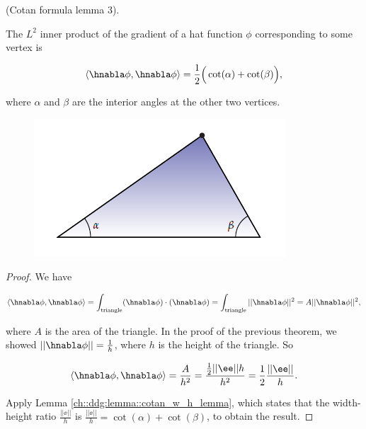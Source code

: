 \begin{lemma}
\label{ch::ddg::lemma::cotan_3}
    (Cotan formula lemma 3).
    
    The $L^2$ inner product of the gradient of a hat function $\phi$ corresponding to some vertex is
    
    \begin{align*}
        \langle \hnabla \phi, \hnabla \phi \rangle = \frac{1}{2} \Big(\cot(\alpha) + \cot(\beta) \Big),
    \end{align*}
    
    where $\alpha$ and $\beta$ are the interior angles at the other two vertices.
    
    \begin{figure}[H]
        \centering
        \includegraphics{images/fem_cotan_lemma3.PNG}
        \caption{\cite[p. 106]{book::DDG}}
    \end{figure}
\end{lemma}

\begin{proof}
    
    We have
    
    \begin{align*}
        \langle \hnabla \phi, \hnabla \phi \rangle
        = \int_{\text{triangle}} (\hnabla \phi) \cdot (\hnabla \phi)
        = \int_{\text{triangle}} ||\hnabla \phi||^2
        = A ||\hnabla \phi||^2,
    \end{align*}
    
    where $A$ is the area of the triangle. In the proof of the previous theorem, we showed $||\hnabla \phi|| = \frac{1}{h}$, where $h$ is the height of the triangle. So
    
    \begin{align*}
        \langle \hnabla \phi, \hnabla \phi \rangle
        = \frac{A}{h^2} 
        = \frac{\frac{1}{2}||\ee||h}{h^2} 
        = \frac{1}{2} \frac{||\ee||}{h}.
    \end{align*}
    
    Apply Lemma \ref{ch::ddg:lemma::cotan_w_h_lemma}, which states that the width-height ratio $\frac{||\ee||}{h}$ is $\frac{||\ee||}{h} = \cot(\alpha) + \cot(\beta)$, to obtain the result.
\end{proof}

